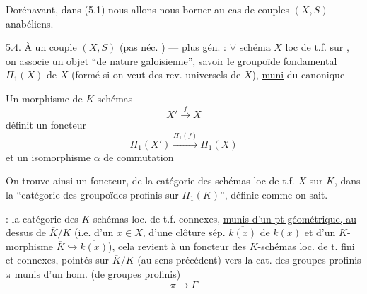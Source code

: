 
Dorénavant, dans (5.1) nous allons nous borner au cas de couples
$(X,S)$ anabéliens.


5.4. À un couple $(X,S)$ (pas néc. ) --- plus gén. :
$\forall$ schéma $X$ loc de t.f. sur , on associe un
objet ``de nature galoisienne'', savoir le groupoïde fondamental
 $\Pi_1(X)$ de $X$ (formé si on veut des rev.
universels de $X$), \uline{muni} du 
 canonique

Un morphisme de $K$-schémas
\[
X' \xrightarrow{f} X
\]
définit un foncteur
\[
\Pi_1(X') \xrightarrow{\Pi_1(f)} \Pi_1(X)
\]
et un isomorphisme $\alpha$ de commutation




On trouve ainsi un foncteur, de la catégorie des schémas loc de t.f.
$X$ sur $K$, dans la ``catégorie des groupoïdes profinis sur
$\Pi_1(K)$'', définie comme on sait.

 : la catégorie des $K$-schémas loc. de t.f.
connexes,  \uline{munis d'un pt géométrique,
au dessus} de $\overline K/K$ (i.e. d'un $x\in X$,
 d'une clôture sép. $\overline{k(x)}$ de $k(x)$ et d'un
$K$-morphisme $\overline K\hookrightarrow\overline{k(x)}$), cela revient
à un foncteur des $K$-schémas loc. de t. fini et connexes, pointés sur
$\overline K/K$ (au sens précédent) vers la cat. des
 groupes profinis  $\pi$
munis d'un hom. (de groupes profinis)
\[
\pi\longrightarrow\Gamma
\]



